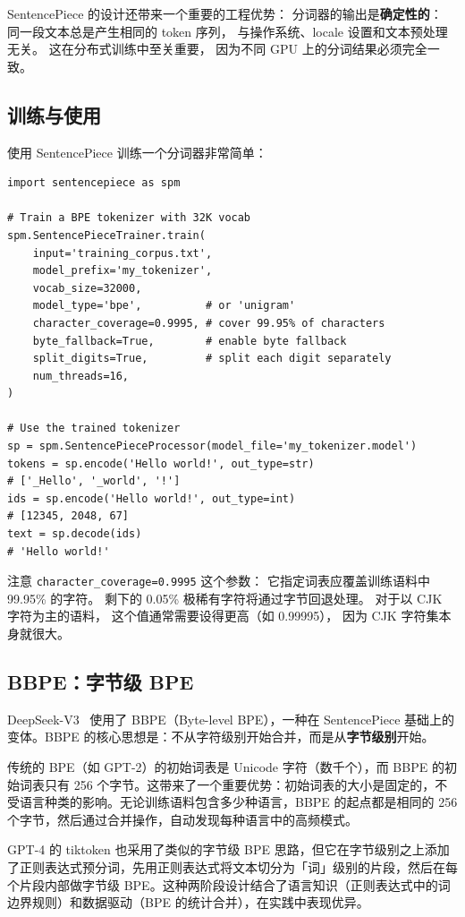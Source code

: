 SentencePiece 的设计还带来一个重要的工程优势：
分词器的输出是\textbf{确定性的}：
同一段文本总是产生相同的 token 序列，
与操作系统、locale 设置和文本预处理无关。
这在分布式训练中至关重要，
因为不同 GPU 上的分词结果必须完全一致。

\subsection{训练与使用}

使用 SentencePiece 训练一个分词器非常简单：

\begin{lstlisting}[caption={Training a SentencePiece tokenizer}]
import sentencepiece as spm

# Train a BPE tokenizer with 32K vocab
spm.SentencePieceTrainer.train(
    input='training_corpus.txt',
    model_prefix='my_tokenizer',
    vocab_size=32000,
    model_type='bpe',          # or 'unigram'
    character_coverage=0.9995, # cover 99.95% of characters
    byte_fallback=True,        # enable byte fallback
    split_digits=True,         # split each digit separately
    num_threads=16,
)

# Use the trained tokenizer
sp = spm.SentencePieceProcessor(model_file='my_tokenizer.model')
tokens = sp.encode('Hello world!', out_type=str)
# ['_Hello', '_world', '!']
ids = sp.encode('Hello world!', out_type=int)
# [12345, 2048, 67]
text = sp.decode(ids)
# 'Hello world!'
\end{lstlisting}

注意 \texttt{character\_coverage=0.9995} 这个参数：
它指定词表应覆盖训练语料中 99.95\% 的字符。
剩下的 0.05\% 极稀有字符将通过字节回退处理。
对于以 CJK 字符为主的语料，
这个值通常需要设得更高（如 0.99995），
因为 CJK 字符集本身就很大。

\subsection{BBPE：字节级 BPE}

DeepSeek-V3~\cite{deepseekv3} 使用了 BBPE（Byte-level BPE），一种在 SentencePiece 基础上的变体。BBPE 的核心思想是：不从字符级别开始合并，而是从\textbf{字节级别}开始。

传统的 BPE（如 GPT-2）的初始词表是 Unicode 字符（数千个），而 BBPE 的初始词表只有 256 个字节。这带来了一个重要优势：初始词表的大小是固定的，不受语言种类的影响。无论训练语料包含多少种语言，BBPE 的起点都是相同的 256 个字节，然后通过合并操作，自动发现每种语言中的高频模式。

GPT-4 的 tiktoken 也采用了类似的字节级 BPE 思路，但它在字节级别之上添加了正则表达式预分词，先用正则表达式将文本切分为「词」级别的片段，然后在每个片段内部做字节级 BPE。这种两阶段设计结合了语言知识（正则表达式中的词边界规则）和数据驱动（BPE 的统计合并），在实践中表现优异。

